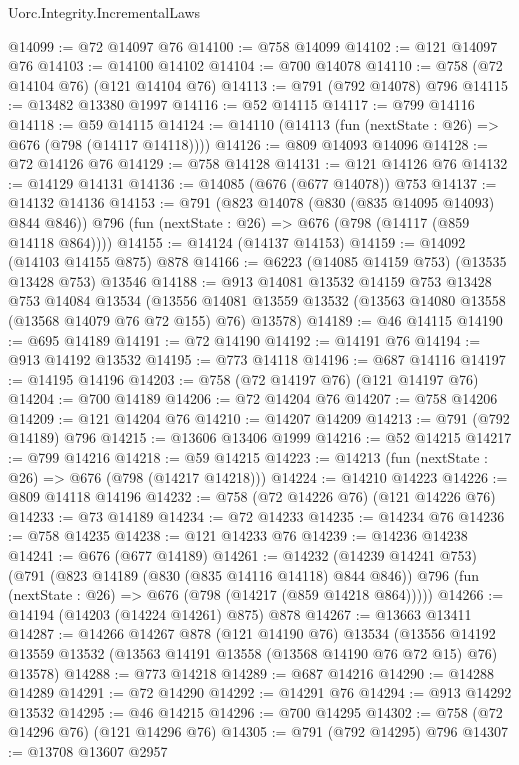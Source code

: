 \begin{lexlean}{Uorc.Integrity.IncrementalLaws}
\begin{coremodule}
@14099 := @72 @14097 @76
@14100 := @758 @14099
@14102 := @121 @14097 @76
@14103 := @14100 @14102
@14104 := @700 @14078
@14110 := @758 (@72 @14104 @76) (@121 @14104 @76)
@14113 := @791 (@792 @14078) @796
@14115 := @13482 @13380 @1997
@14116 := @52 @14115
@14117 := @799 @14116
@14118 := @59 @14115
@14124 := @14110 (@14113 (fun (nextState : @26) => @676 (@798 (@14117 @14118))))
@14126 := @809 @14093 @14096
@14128 := @72 @14126 @76
@14129 := @758 @14128
@14131 := @121 @14126 @76
@14132 := @14129 @14131
@14136 := @14085 (@676 (@677 @14078)) @753
@14137 := @14132 @14136
@14153 := @791
    (@823 @14078 (@830 (@835 @14095 @14093) @844 @846))
    @796
    (fun (nextState : @26) => @676 (@798 (@14117 (@859 @14118 @864))))
@14155 := @14124 (@14137 @14153)
@14159 := @14092 (@14103 @14155 @875) @878
@14166 := @6223 (@14085 @14159 @753) (@13535 @13428 @753) @13546
@14188 := @913
    @14081
    @13532
    @14159
    @753
    @13428
    @753
    @14084
    @13534
    (@13556 @14081 @13559 @13532 (@13563 @14080 @13558 (@13568 @14079 @76 @72 @155) @76) @13578)
@14189 := @46 @14115
@14190 := @695 @14189
@14191 := @72 @14190
@14192 := @14191 @76
@14194 := @913 @14192 @13532
@14195 := @773 @14118
@14196 := @687 @14116
@14197 := @14195 @14196
@14203 := @758 (@72 @14197 @76) (@121 @14197 @76)
@14204 := @700 @14189
@14206 := @72 @14204 @76
@14207 := @758 @14206
@14209 := @121 @14204 @76
@14210 := @14207 @14209
@14213 := @791 (@792 @14189) @796
@14215 := @13606 @13406 @1999
@14216 := @52 @14215
@14217 := @799 @14216
@14218 := @59 @14215
@14223 := @14213 (fun (nextState : @26) => @676 (@798 (@14217 @14218)))
@14224 := @14210 @14223
@14226 := @809 @14118 @14196
@14232 := @758 (@72 @14226 @76) (@121 @14226 @76)
@14233 := @73 @14189
@14234 := @72 @14233
@14235 := @14234 @76
@14236 := @758 @14235
@14238 := @121 @14233 @76
@14239 := @14236 @14238
@14241 := @676 (@677 @14189)
@14261 := @14232
    (@14239 @14241 @753)
    (@791
      (@823 @14189 (@830 (@835 @14116 @14118) @844 @846))
      @796
      (fun (nextState : @26) => @676 (@798 (@14217 (@859 @14218 @864)))))
@14266 := @14194 (@14203 (@14224 @14261) @875) @878
@14267 := @13663 @13411
@14287 := @14266
    @14267
    @878
    (@121 @14190 @76)
    @13534
    (@13556 @14192 @13559 @13532 (@13563 @14191 @13558 (@13568 @14190 @76 @72 @15) @76) @13578)
@14288 := @773 @14218
@14289 := @687 @14216
@14290 := @14288 @14289
@14291 := @72 @14290
@14292 := @14291 @76
@14294 := @913 @14292 @13532
@14295 := @46 @14215
@14296 := @700 @14295
@14302 := @758 (@72 @14296 @76) (@121 @14296 @76)
@14305 := @791 (@792 @14295) @796
@14307 := @13708 @13607 @2957

\end{coremodule}
\end{lexlean}
